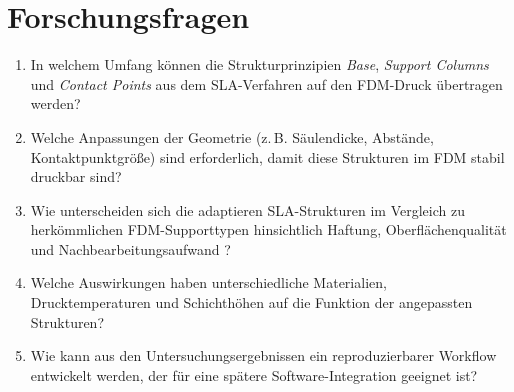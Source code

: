 \chapter{Forschungsfragen}
\label{cha:Forschungsfragen}

\begin{enumerate}
  \item In welchem Umfang können die Strukturprinzipien \textit{Base}, \textit{Support Columns} und \textit{Contact Points} aus dem SLA-Verfahren auf den FDM-Druck übertragen werden?  
  \item Welche Anpassungen der Geometrie (z.\,B. Säulendicke, Abstände, Kontaktpunktgröße) sind erforderlich, damit diese Strukturen im FDM stabil druckbar sind?  
  \item Wie unterscheiden sich die adaptieren SLA-Strukturen im Vergleich zu herkömmlichen FDM-Supporttypen hinsichtlich Haftung, Oberflächenqualität und Nachbearbeitungsaufwand \cite{JiangSupportReview}?  
  \item Welche Auswirkungen haben unterschiedliche Materialien, Drucktemperaturen und Schichthöhen auf die Funktion der angepassten Strukturen?  
  \item Wie kann aus den Untersuchungsergebnissen ein reproduzierbarer Workflow entwickelt werden, der für eine spätere Software-Integration geeignet ist?
\end{enumerate}
